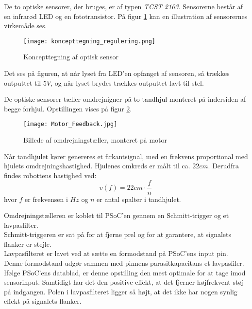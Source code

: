 De to optiske sensorer, der bruges, er af typen \textit{TCST 2103}. 
Sensorerne består af en infrarød LED og en fototransistor. På figur \ref{fig:koncept_optisksensor} kan en illustration af sensorernes virkemåde ses.

\begin{figure}[H] %
\centering
\texttt{[image: koncepttegning\_regulering.png]}
\caption{Koncepttegning af optisk sensor}
\label{fig:koncept_optisksensor}
\end{figure}

Det ses på figuren, at når lyset fra LED'en opfanget af sensoren, så trækkes outputtet til $5 V$, og når lyset brydes trækkes outputtet lavt til stel. 

De optiske sensorer tæller omdrejnigner på to tandhjul monteret på indersiden af begge forhjul. 
Opstillingen vises på figur \ref{fig:motor_feedback}.

\begin{figure}[H] %
\centering
\texttt{[image: Motor\_Feedback.jpg]}
\caption{Billede af omdrejningstæller, monteret på motor}
\label{fig:motor_feedback}
\end{figure}

Når tandhjulet kører genereres et firkantsignal, med en frekvens proportional med hjulets omdrejningshastighed. 
Hjulenes omkreds er målt til ca. $22 cm$. 
Derudfra findes robottens hastighed ved:
\begin{equation}\label{eq1}
v(f)= 22cm \cdot \frac{f}{n}\,
\end{equation}
hvor $f$ er frekvensen i $Hz$ og $n$ er antal spalter i tandhjulet. 

Omdrejningstælleren er koblet til PSoC'en gennem en Schmitt-trigger og et lavpasfilter. \\
Schmitt-triggeren er sat på for at fjerne prel og for at garantere, at signalets flanker er stejle. \\
Lavpasfilteret er lavet ved at sætte en formodstand på PSoC'ens input pin. 
Denne formodstand udgør sammen med pinnens parasitkapacitans et lavpasfiler. 
Ifølge PSoC'ens datablad, er denne opstilling den mest optimale for at tage imod sensorinput. 
Samtidigt har det den positive effekt, at det fjerner højfrekvent støj på indgangen. 
Polen i lavpasfilteret ligger så højt, at det ikke har nogen synlig effekt på signalets flanker. 

